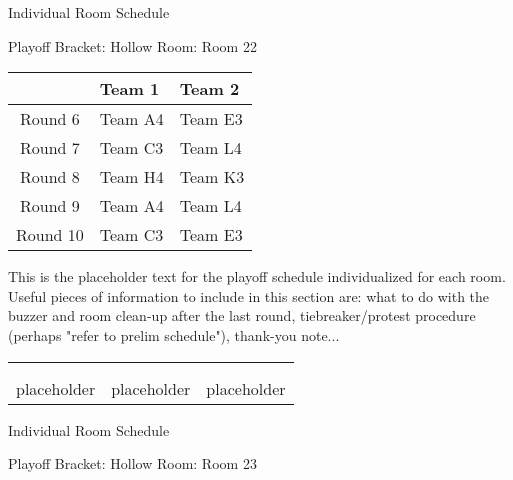 \documentclass{article}%
\begin{document}
\newpage%
\begin{center}%
\begin{Huge}%
Individual Room Schedule%
\end{Huge}%
\vspace*{16pt}%
\linebreak%
\begin{Large}%
Playoff Bracket: Hollow \hfill Room: Room 22%
\end{Large}%
\end{center}%
%
\begin{tabularx}{\textwidth}{|c|Y|Y|}%
\hline%
&Team 1&Team 2\\%
\hline%
Round 6&Team A4&Team E3\\%
Round 7&Team C3&Team L4\\%
Round 8&Team H4&Team K3\\%
Round 9&Team A4&Team L4\\%
Round 10&Team C3&Team E3\\%
\hline%
\end{tabularx}%
\vspace*{16pt}%
\linebreak%
This is the placeholder text for the playoff schedule individualized for each room. Useful pieces of information to include in this section are: what to do with the buzzer and room clean{-}up after the last round, tiebreaker/protest procedure (perhaps "refer to prelim schedule"), thank{-}you note...%
\vspace*{30pt}%
\newline%
%
\begin{tabularx}{\textwidth}{YYY}%
  &  &  \\%
\\%
placeholder&placeholder&placeholder\\%
\end{tabularx}%
\newpage%
\begin{center}%
\begin{Huge}%
Individual Room Schedule%
\end{Huge}%
\vspace*{16pt}%
\linebreak%
\begin{Large}%
Playoff Bracket: Hollow \hfill Room: Room 23%
\end{Large}%
\end{center}%
\end{document}
